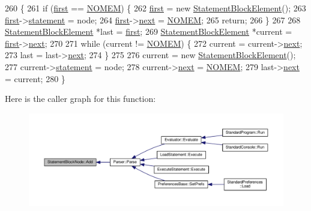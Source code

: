 \begin{DoxyCode}
260 \{
261     \textcolor{keywordflow}{if} (\hyperlink{classStatementBlockNode_a3861ceb40580ec2c56870c2834c62341}{first} == \hyperlink{platform_8h_a46ff2bfbf0d44b8466a2251d5bd5e6f8}{NOMEM}) \{
262         \hyperlink{classStatementBlockNode_a3861ceb40580ec2c56870c2834c62341}{first} = \textcolor{keyword}{new} \hyperlink{structStatementBlockElement}{StatementBlockElement}();
263         \hyperlink{classStatementBlockNode_a3861ceb40580ec2c56870c2834c62341}{first}->\hyperlink{structStatementBlockElement_a9ac07a402a18f927cb895cdbd86d6a06}{statement} = node;
264         \hyperlink{classStatementBlockNode_a3861ceb40580ec2c56870c2834c62341}{first}->\hyperlink{structStatementBlockElement_aa6001c0b1578810f85004ae397da2387}{next} = \hyperlink{platform_8h_a46ff2bfbf0d44b8466a2251d5bd5e6f8}{NOMEM};
265         \textcolor{keywordflow}{return};
266     \}
267 
268     \hyperlink{structStatementBlockElement}{StatementBlockElement} *last = \hyperlink{classStatementBlockNode_a3861ceb40580ec2c56870c2834c62341}{first};
269     \hyperlink{structStatementBlockElement}{StatementBlockElement} *current = \hyperlink{classStatementBlockNode_a3861ceb40580ec2c56870c2834c62341}{first}->\hyperlink{structStatementBlockElement_aa6001c0b1578810f85004ae397da2387}{next};
270 
271     \textcolor{keywordflow}{while} (current != \hyperlink{platform_8h_a46ff2bfbf0d44b8466a2251d5bd5e6f8}{NOMEM}) \{
272         current = current->\hyperlink{structStatementBlockElement_aa6001c0b1578810f85004ae397da2387}{next};
273         last = last->\hyperlink{structStatementBlockElement_aa6001c0b1578810f85004ae397da2387}{next};
274     \}
275 
276     current = \textcolor{keyword}{new} \hyperlink{structStatementBlockElement}{StatementBlockElement}();
277     current->\hyperlink{structStatementBlockElement_a9ac07a402a18f927cb895cdbd86d6a06}{statement} = node;
278     current->\hyperlink{structStatementBlockElement_aa6001c0b1578810f85004ae397da2387}{next} = \hyperlink{platform_8h_a46ff2bfbf0d44b8466a2251d5bd5e6f8}{NOMEM};
279     last->\hyperlink{structStatementBlockElement_aa6001c0b1578810f85004ae397da2387}{next} = current;
280 \}
\end{DoxyCode}


Here is the caller graph for this function\+:
\nopagebreak
\begin{figure}[H]
\begin{center}
\leavevmode
\includegraphics[width=350pt]{d5/d22/classStatementBlockNode_a7cdae86c013121c1fdab0ee885c2b559_icgraph}
\end{center}
\end{figure}


